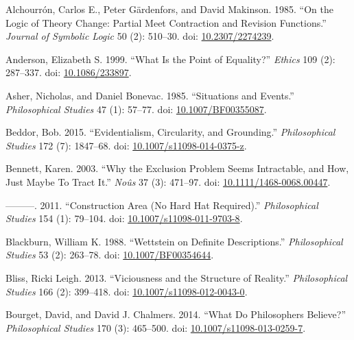 \documentclass[
  11pt,
  letterpaper,
  DIV=11,
  numbers=noendperiod,
  twoside]{scrartcl}
\newlength{\cslhangindent}
\newenvironment{CSLReferences}[2] %
 {\begin{list}{}{%
  \setlength{\itemindent}{0pt}
  \setlength{\leftmargin}{0pt}
  \setlength{\parsep}{0pt}
  \ifodd #1
   \setlength{\leftmargin}{\cslhangindent}
   \setlength{\itemindent}{-1\cslhangindent}
  \fi
  \setlength{\itemsep}{#2\baselineskip}}}
 {\end{list}}
\begin{document}
\label{refs}
\begin{CSLReferences}{1}{0}
Alchourrón, Carlos E., Peter Gärdenfors, and David Makinson. 1985. {``On
the Logic of Theory Change: Partial Meet Contraction and Revision
Functions.''} \emph{Journal of Symbolic Logic} 50 (2): 510--30. doi:
\href{https://doi.org/10.2307/2274239}{10.2307/2274239}.

Anderson, Elizabeth S. 1999. {``What Is the Point of Equality?''}
\emph{Ethics} 109 (2): 287--337. doi:
\href{https://doi.org/10.1086/233897}{10.1086/233897}.

Asher, Nicholas, and Daniel Bonevac. 1985. {``Situations and Events.''}
\emph{Philosophical Studies} 47 (1): 57--77. doi:
\href{https://doi.org/10.1007/BF00355087}{10.1007/BF00355087}.

Beddor, Bob. 2015. {``Evidentialism, Circularity, and Grounding.''}
\emph{Philosophical Studies} 172 (7): 1847--68. doi:
\href{https://doi.org/10.1007/s11098-014-0375-z}{10.1007/s11098-014-0375-z}.

Bennett, Karen. 2003. {``Why the Exclusion Problem Seems Intractable,
and How, Just Maybe To Tract It.''} \emph{Noûs} 37 (3): 471--97. doi:
\href{https://doi.org/10.1111/1468-0068.00447}{10.1111/1468-0068.00447}.

---------. 2011. {``Construction Area (No Hard Hat Required).''}
\emph{Philosophical Studies} 154 (1): 79--104. doi:
\href{https://doi.org/10.1007/s11098-011-9703-8}{10.1007/s11098-011-9703-8}.

Blackburn, William K. 1988. {``Wettstein on Definite Descriptions.''}
\emph{Philosophical Studies} 53 (2): 263--78. doi:
\href{https://doi.org/10.1007/BF00354644}{10.1007/BF00354644}.

Bliss, Ricki Leigh. 2013. {``Viciousness and the Structure of
Reality.''} \emph{Philosophical Studies} 166 (2): 399--418. doi:
\href{https://doi.org/10.1007/s11098-012-0043-0}{10.1007/s11098-012-0043-0}.

Bourget, David, and David J. Chalmers. 2014. {``What Do Philosophers
Believe?''} \emph{Philosophical Studies} 170 (3): 465--500. doi:
\href{https://doi.org/10.1007/s11098-013-0259-7}{10.1007/s11098-013-0259-7}.


\end{CSLReferences}
\end{document}
